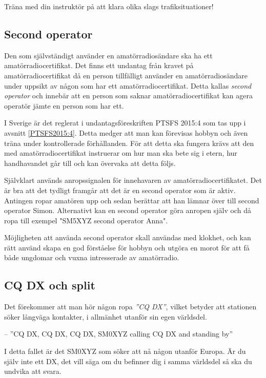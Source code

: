 Träna med din instruktör på att klara olika slags trafiksituationer!

\subsection{Second operator}
\label{secondoperator}

Den som självständigt använder en amatörradiosändare ska ha ett
amatörradiocertifikat.
Det finns ett undantag från kravet på amatörradiocertifikat då en person
tillfälligt använder en amatörradiosändare under uppsikt av någon som har ett
amatörradiocertifikat.
Detta kallas \emph{second operator} och innebär att en person som saknar
amatörradiocertifikat kan agera operatör jämte en person som har ett.

I Sverige är det reglerat i undantagsföreskriften PTSFS 2015:4 som tas upp i
avsnitt \ref{PTSFS2015:4}.
Detta medger att man kan förevisas hobbyn och även träna under kontrollerade
förhållanden.
För att detta ska fungera krävs att den med amatörradiocertifikat instruerar
om hur man ska bete sig i etern, hur handhavandet går till och kan övervaka
att detta följs.

Självklart används anropssignalen för innehavaren av amatörradiocertifikatet.
Det är bra att det tydligt framgår att det är en second operator som är aktiv.
Antingen ropar amatören upp och sedan berättar att han lämnar över till second
operator Simon.
Alternativt kan en second operator göra anropen själv och då ropa till exempel
"SM5XYZ second operator Anna".

Möjligheten att använda second operator skall användas med klokhet, och kan rätt
använd skapa en god förståelse för hobbyn och utgöra en morot för att få både
ungdomar och vuxna intresserade av amatörradio.

\subsection{CQ DX och split}

Det förekommer att man hör någon ropa \emph{''CQ DX''}, vilket betyder att
stationen söker långväga kontakter, i allmänhet utanför sin egen världsdel.

-- ''CQ DX, CQ DX, CQ DX, SM0XYZ calling CQ DX and standing by''

I detta fallet är det SM0XYZ som söker att nå någon utanför Europa.
Är du själv inte ett DX, det vill säga om du befinner dig i samma världsdel så
ska du undvika att svara.

